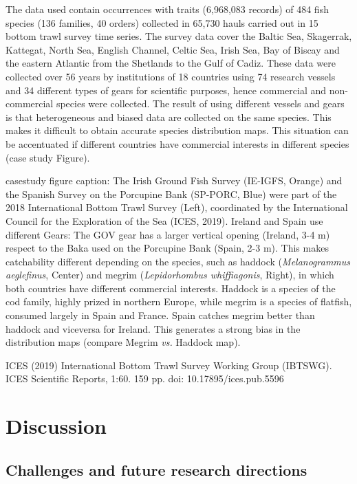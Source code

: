\documentclass[12pt,a4paper]{article}
\begin{document}
The data used contain occurrences with traits (6,968,083 records) of 484 fish species (136 families, 40 orders) collected in 65,730 hauls carried out in 15 bottom trawl survey time series. The survey data cover the Baltic Sea, Skagerrak, Kattegat, North Sea, English Channel, Celtic Sea, Irish Sea, Bay of Biscay and the eastern Atlantic from the Shetlands to the Gulf of Cadiz. These data were collected over 56 years by institutions of 18 countries using 74 research vessels and 34 different types of gears for scientific purposes, hence commercial and non-commercial species were collected. The result of using different vessels and gears is that heterogeneous and biased data are collected on the same species. This makes it difficult to obtain accurate species distribution maps. This situation can be accentuated if different countries have commercial interests in different species (case study Figure).

casestudy figure caption: The Irish Ground Fish Survey (IE-IGFS, Orange) and the Spanish Survey on the Porcupine Bank (SP-PORC, Blue) were part of the 2018 International Bottom Trawl Survey (Left), coordinated by the International Council for the Exploration of the Sea (ICES, 2019). Ireland and Spain use different Gears: The GOV gear has a larger vertical opening (Ireland, 3-4 m) respect to the Baka used on the Porcupine Bank (Spain, 2-3 m). This makes catchability different depending on the species, such as haddock (\textit{Melanogrammus aeglefinus}, Center) and megrim (\textit{Lepidorhombus whiffiagonis}, Right), in which both countries have different commercial interests. Haddock is a species of the cod family, highly prized in northern Europe, while megrim is a species of flatfish, consumed largely in Spain and France. Spain catches megrim better than haddock and viceversa for Ireland. This generates a strong bias in the distribution maps (compare Megrim \textit{vs.} Haddock map).

ICES (2019) International Bottom Trawl Survey Working Group (IBTSWG). ICES Scientific Reports, 1:60. 159 pp. doi: 10.17895/ices.pub.5596


\section{Discussion}

\subsection{Challenges and future research directions}
\end{document}
